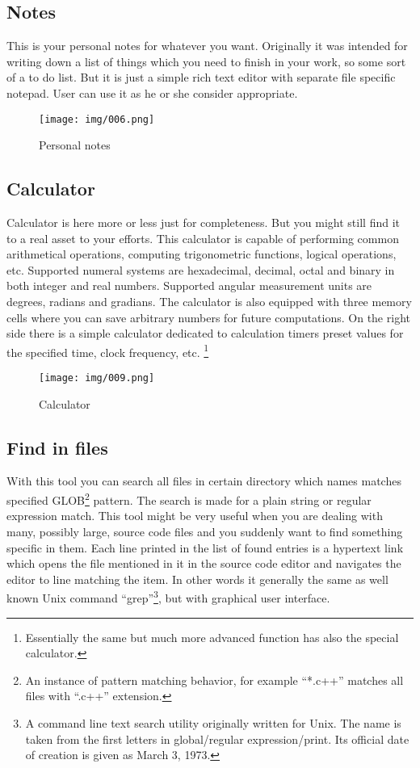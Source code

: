 \documentclass[a4paper,twoside,12pt]{book}
\begin{document}
		\subsection{Notes}
			This is your personal notes for whatever you want. Originally it was intended for writing down a list of things which you need to finish in your work, so some sort of a to do list. But it is just a simple rich text editor with separate file specific notepad. User can use it as he or she consider appropriate.
			\begin{figure}[h!]
				\centering{}
				\texttt{[image: img/006.png]}
				\caption{Personal notes}
			\end{figure}

		\subsection{Calculator}
			Calculator is here more or less just for completeness. But you might still find it to a real asset to your efforts. This calculator is capable of performing common arithmetical operations, computing trigonometric functions, logical operations, etc. Supported numeral systems are hexadecimal, decimal, octal and binary in both integer and real numbers. Supported angular measurement units are degrees, radians and gradians. The calculator is also equipped with three memory cells where you can save arbitrary numbers for future computations. On the right side there is a simple calculator dedicated to calculation timers preset values for the specified time, clock frequency, etc. \footnote{Essentially the same but much more advanced function has also the special calculator.}
			\begin{figure}[h!]
				\centering{}
				\texttt{[image: img/009.png]}
				\caption{Calculator}
			\end{figure}

		\subsection{Find in files}
			With this tool you can search all files in certain directory which names matches specified GLOB\footnote{An instance of pattern matching behavior, for example ``*.c++'' matches all files with ``.c++'' extension.} pattern. The search is made for a plain string or regular expression match. This tool might be very useful when you are dealing with many, possibly large, source code files and you suddenly want to find something specific in them. Each line printed in the list of found entries is a hypertext link which opens the file mentioned in it in the source code editor and navigates the editor to line matching the item. In other words it generally the same as well known Unix command ``grep''\footnote{A command line text search utility originally written for Unix. The name is taken from the first letters in global/regular expression/print. Its official date of creation is given as March 3, 1973.}, but with graphical user interface.
\end{document}
